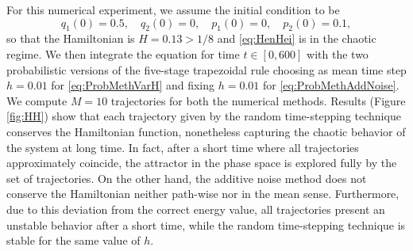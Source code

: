 \documentclass{siamart1116}
\numberwithin{theorem}{section}
\begin{document}
For this numerical experiment, we assume the initial condition to be
\begin{equation}
	q_1(0) = 0.5,\quad q_2(0) = 0, \quad p_1(0) = 0, \quad p_2(0) = 0.1,
\end{equation}
so that the Hamiltonian is $H = 0.13 > 1/8$ and \eqref{eq:HenHei} is in the chaotic regime. We then integrate the equation for time $t \in [0, 600]$ with the two probabilistic versions of the five-stage trapezoidal rule choosing as mean time step $h = 0.01$ for \eqref{eq:ProbMethVarH} and fixing $h = 0.01$ for \eqref{eq:ProbMethAddNoise}. We compute $M = 10$ trajectories for both the numerical methods. Results (Figure \ref{fig:HH}) show that each trajectory given by the random time-stepping technique conserves the Hamiltonian function, nonetheless capturing the chaotic behavior of the system at long time. In fact, after a short time where all trajectories approximately coincide, the attractor in the phase space is explored fully by the set of trajectories. On the other hand, the additive noise method does not conserve the Hamiltonian neither path-wise nor in the mean sense. Furthermore, due to this deviation from the correct energy value, all trajectories present an unstable behavior after a short time, while the random time-stepping technique is stable for the same value of $h$.




\end{document}
